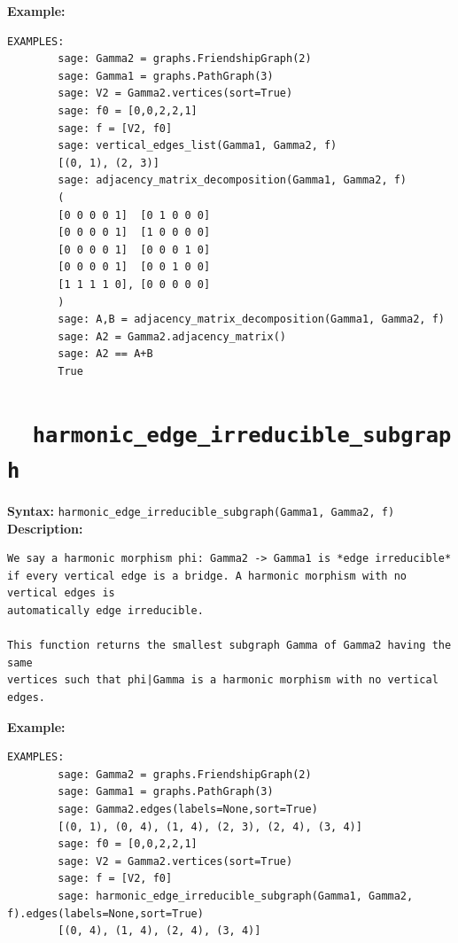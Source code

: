 \documentclass{article}
\begin{document}
\textbf{Example:}
\begin{verbatim}
EXAMPLES:
        sage: Gamma2 = graphs.FriendshipGraph(2)                                           
        sage: Gamma1 = graphs.PathGraph(3)                                                 
        sage: V2 = Gamma2.vertices(sort=True)                                                       
        sage: f0 = [0,0,2,2,1]                                                             
        sage: f = [V2, f0]                                                                 
        sage: vertical_edges_list(Gamma1, Gamma2, f)                                       
        [(0, 1), (2, 3)]
        sage: adjacency_matrix_decomposition(Gamma1, Gamma2, f)                            
        (
        [0 0 0 0 1]  [0 1 0 0 0]
        [0 0 0 0 1]  [1 0 0 0 0]
        [0 0 0 0 1]  [0 0 0 1 0]
        [0 0 0 0 1]  [0 0 1 0 0]
        [1 1 1 1 0], [0 0 0 0 0]
        )
        sage: A,B = adjacency_matrix_decomposition(Gamma1, Gamma2, f)                      
        sage: A2 = Gamma2.adjacency_matrix()
        sage: A2 == A+B                                                                    
        True
\end{verbatim}

\section{\tt \ \ harmonic\_edge\_irreducible\_subgraph}

\textbf{Syntax:} \verb}harmonic_edge_irreducible_subgraph(Gamma1, Gamma2, f)}\\

\textbf{Description:}
\begin{verbatim}
We say a harmonic morphism phi: Gamma2 -> Gamma1 is *edge irreducible*
if every vertical edge is a bridge. A harmonic morphism with no vertical edges is
automatically edge irreducible.

This function returns the smallest subgraph Gamma of Gamma2 having the same
vertices such that phi|Gamma is a harmonic morphism with no vertical edges.
\end{verbatim}

\textbf{Example:}
\begin{verbatim}
EXAMPLES:
        sage: Gamma2 = graphs.FriendshipGraph(2)                                           
        sage: Gamma1 = graphs.PathGraph(3)                                                 
        sage: Gamma2.edges(labels=None,sort=True)                                                    
        [(0, 1), (0, 4), (1, 4), (2, 3), (2, 4), (3, 4)]
        sage: f0 = [0,0,2,2,1]                                                             
        sage: V2 = Gamma2.vertices(sort=True)                                                       
        sage: f = [V2, f0]  
        sage: harmonic_edge_irreducible_subgraph(Gamma1, Gamma2, f).edges(labels=None,sort=True)              
        [(0, 4), (1, 4), (2, 4), (3, 4)]
\end{verbatim}
\end{document}
